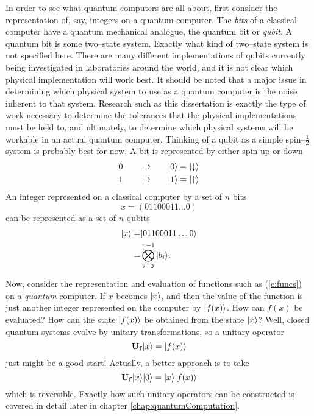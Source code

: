 In order to see what quantum computers are all about, first consider 
the representation of, say, integers on a quantum computer.
The {\sl bits} of a classical computer have a quantum mechanical analogue,
the quantum bit or \emph{qubit}.
A quantum bit is some two--state system.
Exactly what kind
of two--state system is not specified here.  There are many
different implementations of qubits currently being investigated
in laboratories
around the world, and it is not clear which physical implementation
will work best.  
It should be noted that a major issue in determining which physical system 
to use as a quantum computer is the noise inherent to that system.  
Research such as this dissertation is exactly the type of work necessary 
to determine the tolerances that the physical implementations must be held 
to, and ultimately, to determine which physical systems will be workable 
in an actual quantum computer.
Thinking of a qubit as a simple spin--$\frac{1}{2}$ system
is probably best for now.
A bit is represented by either spin up or down
\begin{equation}
\begin{split}
0\qquad\mapsto\qquad&{|{0}\rangle}={|{\downarrow}\rangle}\\
1\qquad\mapsto\qquad&{|{1}\rangle}={|{\uparrow}\rangle}\\
\end{split}
\end{equation}
An integer represented on a classical computer by a set of $n$ bits
\begin{equation}
x = (01100011\ldots0)
\end{equation}
can be represented as a set of $n$ qubits
\begin{equation}
\begin{split}
{|{x}\rangle} =& {|{01100011\ldots0}\rangle}\\
  =& \bigotimes_{i=0}^{n-1} {|{b_i}\rangle}.
\end{split}
\end{equation}

Now, consider the representation and evaluation of functions such as 
(\ref{e:funcs}) on a \emph{quantum} computer.
If $x$ becomes ${|{x}\rangle}$, and then the value of the function is just
another integer represented on the computer by ${|{f(x)}\rangle}$.
How can $f(x)$ be evaluated?  How can the state ${|{f(x)}\rangle}$ be
obtained from the state ${|{x}\rangle}$?  Well, closed quantum systems 
evolve by unitary transformations, so a unitary operator
\begin{equation}
{\bf U_f}{|{x}\rangle} = {|{f(x)}\rangle}
\end{equation}
just might be a good start!
Actually, a better approach is to take
\begin{equation}
{\bf U_f}{|{x}\rangle}{|{0}\rangle} = {|{x}\rangle}{|{f(x)}\rangle}
\end{equation}
which is reversible.  Exactly how such unitary operators can be 
constructed is covered in detail later in 
chapter \ref{chap:quantumComputation}.

